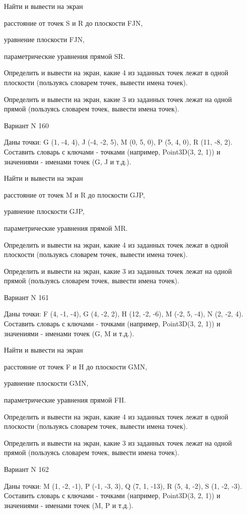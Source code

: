 \documentclass[11pt]{report}
\begin{document}
Найти и вывести на экран


расстояние от точек S и R до плоскости FJN,


уравнение плоскости FJN,


параметрические уравнения прямой SR.


Определить и вывести на экран, какие 4 из заданных точек лежат в одной плоскости (пользуясь словарем точек, вывести имена точек).


Определить и вывести на экран, какие 3 из заданных точек лежат на одной прямой (пользуясь словарем точек, вывести имена точек).

\newpage
Вариант N 160

Даны точки: G (1, -4, 4), J (-4, -2, 5), M (0, 5, 0), P (5, 4, 0), R (11, -8, 2).
Составить словарь с ключами - точками (например, Point3D(3, 2, 1)) и значениями - именами точек (G, J и т.д.).


Найти и вывести на экран


расстояние от точек M и R до плоскости GJP,


уравнение плоскости GJP,


параметрические уравнения прямой MR.


Определить и вывести на экран, какие 4 из заданных точек лежат в одной плоскости (пользуясь словарем точек, вывести имена точек).


Определить и вывести на экран, какие 3 из заданных точек лежат на одной прямой (пользуясь словарем точек, вывести имена точек).

\newpage
Вариант N 161

Даны точки: F (4, -1, -4), G (4, -2, 2), H (12, -2, -6), M (-2, 5, -4), N (2, -2, 4).
Составить словарь с ключами - точками (например, Point3D(3, 2, 1)) и значениями - именами точек (G, M и т.д.).


Найти и вывести на экран


расстояние от точек F и H до плоскости GMN,


уравнение плоскости GMN,


параметрические уравнения прямой FH.


Определить и вывести на экран, какие 4 из заданных точек лежат в одной плоскости (пользуясь словарем точек, вывести имена точек).


Определить и вывести на экран, какие 3 из заданных точек лежат на одной прямой (пользуясь словарем точек, вывести имена точек).

\newpage
Вариант N 162

Даны точки: M (1, -2, -1), P (-1, -3, 3), Q (7, 1, -13), R (5, 4, -2), S (1, -2, -3).
Составить словарь с ключами - точками (например, Point3D(3, 2, 1)) и значениями - именами точек (M, P и т.д.).
\end{document}
